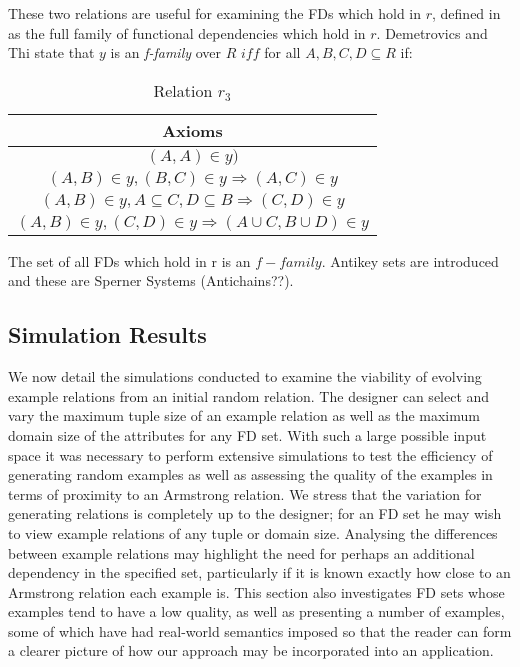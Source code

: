 These two relations are useful for examining the FDs which hold in $r$, defined
in \cite{dt95} as the full family of functional dependencies which
hold in $r$.  Demetrovics and Thi state that $y$ is an {\em f-family}
over $R$ $iff$ for all $A,B,C,D \subseteq R$ if:

{\line
\begin{table}[ht]
\begin{minipage}[b]{16cm}
\begin{center}
\begin{tabular}{|c|} \hline
Axioms  \\ \hline \hline
$(A,A) \in y)$   \\ 
$(A,B) \in y, (B,C) \in y \Rightarrow  (A,C) \in y$   \\ 
$(A,B) \in y, A \subseteq C, D \subseteq B \Rightarrow  (C , D) \in y$   \\ 
$(A,B) \in y, (C,D) \in y \Rightarrow  (A \cup C , B \cup D) \in y$ \\
\hline
\end{tabular}
\end{center}
\caption{\label{table:1.5} Relation $r_3$}
\end{minipage}
\end{table}
}
\medskip

The set of all FDs which hold in r is an $f-family$.  Antikey sets are
introduced and these are Sperner Systems (Antichains??).



\subsection{Simulation Results}


We now detail the simulations conducted to examine the
viability of evolving example relations from an initial
random relation. The designer can select and vary the maximum tuple size
of an example relation as well as the maximum domain size of the
attributes for any 
FD set. With such a large possible input space it was necessary to
 perform extensive simulations to test
the efficiency of generating random examples as well as assessing
the quality of the examples in terms of proximity to an Armstrong 
relation. We stress that the
variation for generating relations is completely up to the
designer; for an FD set he may wish to view example relations
of any tuple or domain size. Analysing the differences between example relations
 may highlight the need for perhaps
an additional dependency in the specified set, particularly if it
is known exactly how close to an Armstrong relation each example is. 
This section
also investigates FD sets whose examples tend to have a low
quality, as well as presenting a number of examples, some of 
which have had real-world
semantics imposed so that the reader can form a clearer picture
of how our approach may be incorporated into an application.

